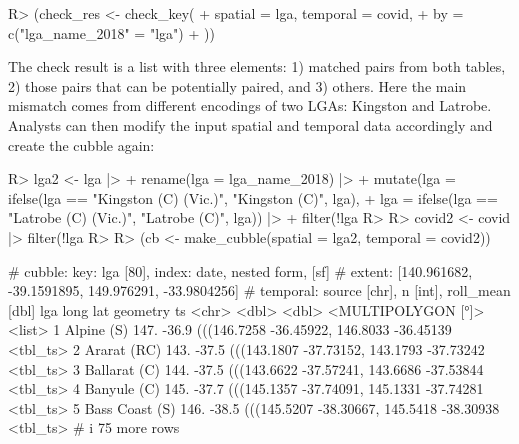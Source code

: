 \documentclass[
  shortnames]{jss}
\begin{document}
\begin{CodeChunk}
\begin{CodeInput}
R> (check_res <- check_key(
+   spatial = lga, temporal = covid, 
+   by = c("lga_name_2018" = "lga")
+ ))
\end{CodeInput}
\end{CodeChunk}

The check result is a list with three elements: 1) matched pairs from both tables, 2) those pairs that can be potentially paired, and 3) others. Here the main mismatch comes from different encodings of two LGAs: Kingston and Latrobe. Analysts can then modify the input spatial and temporal data accordingly and create the cubble again:

\begin{CodeChunk}
\begin{CodeInput}
R> lga2 <- lga |>
+   rename(lga = lga_name_2018) |> 
+   mutate(lga = ifelse(lga == "Kingston (C) (Vic.)", "Kingston (C)", lga),
+          lga = ifelse(lga == "Latrobe (C) (Vic.)", "Latrobe (C)", lga)) |>
+   filter(!lga %
R>   
R> covid2 <- covid |> filter(!lga %
R> 
R> (cb <- make_cubble(spatial = lga2, temporal = covid2))
\end{CodeInput}
\begin{CodeOutput}
# cubble:   key: lga [80], index: date, nested form, [sf]
# extent:   [140.961682, -39.1591895, 149.976291, -33.9804256]
# temporal: source [chr], n [int], roll_mean [dbl]
  lga             long   lat                                   geometry ts      
  <chr>          <dbl> <dbl>                         <MULTIPOLYGON [°]> <list>  
1 Alpine (S)      147. -36.9 (((146.7258 -36.45922, 146.8033 -36.45139~ <tbl_ts>
2 Ararat (RC)     143. -37.5 (((143.1807 -37.73152, 143.1793 -37.73242~ <tbl_ts>
3 Ballarat (C)    144. -37.5 (((143.6622 -37.57241, 143.6686 -37.53844~ <tbl_ts>
4 Banyule (C)     145. -37.7 (((145.1357 -37.74091, 145.1331 -37.74281~ <tbl_ts>
5 Bass Coast (S)  146. -38.5 (((145.5207 -38.30667, 145.5418 -38.30938~ <tbl_ts>
# i 75 more rows
\end{CodeOutput}
\end{CodeChunk}
\end{document}
